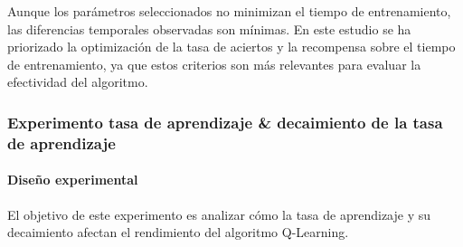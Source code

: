 Aunque los parámetros seleccionados no minimizan el tiempo de entrenamiento, las diferencias temporales observadas son mínimas. En este estudio se ha priorizado la optimización de la tasa de aciertos y la recompensa sobre el tiempo de entrenamiento, ya que estos criterios son más relevantes para evaluar la efectividad del algoritmo.

\newpage
\subsubsection{Experimento tasa de aprendizaje \& decaimiento de la tasa de aprendizaje}

\paragraph{Diseño experimental}
El objetivo de este experimento es analizar cómo la tasa de aprendizaje y su decaimiento afectan el rendimiento del algoritmo Q-Learning.

